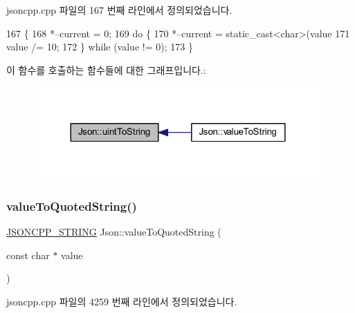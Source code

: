 jsoncpp.\+cpp 파일의 167 번째 라인에서 정의되었습니다.


\begin{DoxyCode}
167                                                                    \{
168   *--current = 0;
169   \textcolor{keywordflow}{do} \{
170     *--current = \textcolor{keyword}{static\_cast<}\textcolor{keywordtype}{char}\textcolor{keyword}{>}(value %
171     value /= 10;
172   \} \textcolor{keywordflow}{while} (value != 0);
173 \}
\end{DoxyCode}
이 함수를 호출하는 함수들에 대한 그래프입니다.\+:\nopagebreak
\begin{figure}[H]
\begin{center}
\leavevmode
\includegraphics[width=312pt]{namespace_json_ac1ffd21a9e55122014353c773ccc496e_icgraph}
\end{center}
\end{figure}
\mbox{\label{namespace_json_aaf777a6923bcb4cf63a2729973fe5315}} 
\subsubsection{\texorpdfstring{value\+To\+Quoted\+String()}{valueToQuotedString()}}
{\footnotesize\ttfamily \hyperlink{json_8h_a1e723f95759de062585bc4a8fd3fa4be}{J\+S\+O\+N\+C\+P\+P\+\_\+\+S\+T\+R\+I\+NG} Json\+::value\+To\+Quoted\+String (\begin{DoxyParamCaption}\item[{const char $\ast$}]{value }\end{DoxyParamCaption})}



jsoncpp.\+cpp 파일의 4259 번째 라인에서 정의되었습니다.


